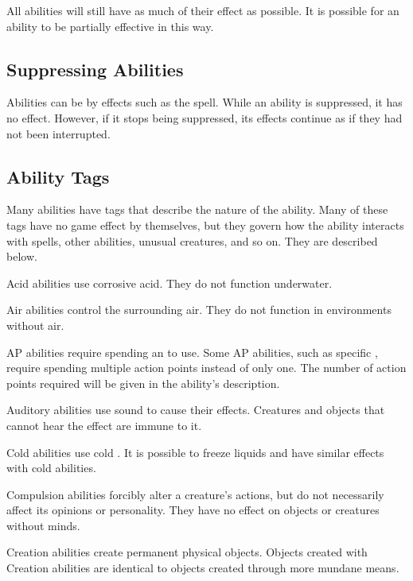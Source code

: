         All abilities will still have as much of their effect as possible.
        It is possible for an ability to be partially effective in this way.

    \subsection{Suppressing Abilities}\label{Suppressing Abilities}
        Abilities can be  by effects such as the  spell.
        While an ability is suppressed, it has no effect.
        However, if it stops being suppressed, its effects continue as if they had not been interrupted.

    \subsection{Ability Tags}\label{Ability Tags}

        Many abilities have tags that describe the nature of the ability.
        Many of these tags have no game effect by themselves, but they govern how the ability interacts with spells, other abilities, unusual creatures, and so on.
        They are described below.

         Acid abilities use corrosive acid.
        They do not function underwater.

         Air abilities control the surrounding air.
        They do not function in environments without air.

         AP abilities require spending an  to use.
        Some AP abilities, such as specific , require spending multiple action points instead of only one.
        The number of action points required will be given in the ability's description.

         Auditory abilities use sound to cause their effects.
        Creatures and objects that cannot hear the effect are immune to it.

         Cold abilities use cold . It is possible to freeze liquids and have similar effects with cold abilities.

         Compulsion abilities forcibly alter a creature's actions, but do not necessarily affect its opinions or personality.
        They have no effect on objects or creatures without minds.

         Creation abilities create permanent physical objects.
        Objects created with Creation abilities are identical to objects created through more mundane means.

